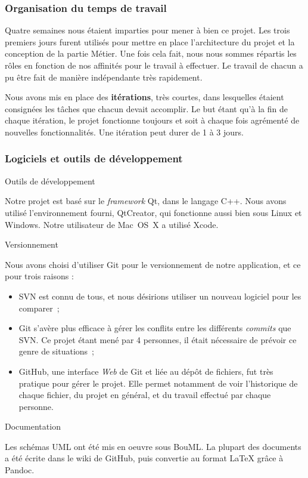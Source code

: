 \subsubsection{Organisation du temps de travail}

Quatre semaines nous étaient imparties pour mener à bien ce projet.
Les trois premiers jours furent utilisés pour mettre en place
l'architecture du projet et la conception de la partie Métier. Une
fois cela fait, nous nous sommes répartis les rôles en fonction de
nos affinités pour le travail à effectuer. Le travail de chacun a
pu être fait de manière indépendante très rapidement.

Nous avons mis en place des \textbf{itérations}, très courtes, dans
lesquelles étaient consignées les tâches que chacun devait
accomplir. Le but étant qu'à la fin de chaque itération, le projet
fonctionne toujours et soit à chaque fois agrémenté de nouvelles
fonctionnalités. Une itération peut durer de 1 à 3 jours.

\subsubsection{Logiciels et outils de développement}

Outils de développement

Notre projet est basé sur le \emph{framework} Qt, dans le langage
C++. Nous avons utilisé l'environnement fourni, QtCreator, qui
fonctionne aussi bien sous Linux et Windows. Notre utilisateur de
Mac~OS~X a utilisé Xcode.

Versionnement

Nous avons choisi d'utiliser Git pour le versionnement de notre
application, et ce pour trois raisons :

\begin{itemize}
\item
  SVN est connu de tous, et nous désirions utiliser un nouveau
  logiciel pour les comparer~;
\item
  Git s'avère plus efficace à gérer les conflits entre les différents
  \emph{commits} que SVN. Ce projet étant mené par 4 personnes, il
  était nécessaire de prévoir ce genre de situations~;
\item
  GitHub, une interface \emph{Web} de Git et liée au dépôt de
  fichiers, fut très pratique pour gérer le projet. Elle permet
  notamment de voir l'historique de chaque fichier, du projet en
  général, et du travail effectué par chaque personne.
\end{itemize}
Documentation

Les schémas UML ont été mis en oeuvre sous BouML. La plupart des
documents a été écrite dans le wiki de GitHub, puis convertie au
format LaTeX grâce à Pandoc.

